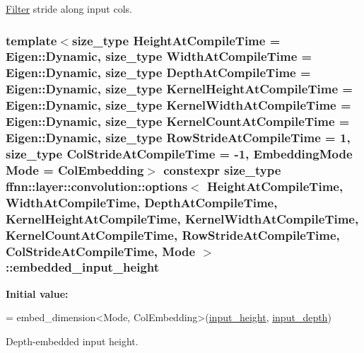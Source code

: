 \hyperlink{classffnn_1_1layer_1_1convolution_1_1_filter}{Filter} stride along input cols. 

\hypertarget{structffnn_1_1layer_1_1convolution_1_1options_a82e23d83d4ff1217b6aec5e49c94785e}{
\subsubsection[{embedded\-\_\-input\-\_\-height}]{\setlength{\rightskip}{0pt plus 5cm}template$<$size\-\_\-type Height\-At\-Compile\-Time = Eigen\-::\-Dynamic, size\-\_\-type Width\-At\-Compile\-Time = Eigen\-::\-Dynamic, size\-\_\-type Depth\-At\-Compile\-Time = Eigen\-::\-Dynamic, size\-\_\-type Kernel\-Height\-At\-Compile\-Time = Eigen\-::\-Dynamic, size\-\_\-type Kernel\-Width\-At\-Compile\-Time = Eigen\-::\-Dynamic, size\-\_\-type Kernel\-Count\-At\-Compile\-Time = Eigen\-::\-Dynamic, size\-\_\-type Row\-Stride\-At\-Compile\-Time = 1, size\-\_\-type Col\-Stride\-At\-Compile\-Time = -\/1, Embedding\-Mode Mode = Col\-Embedding$>$ constexpr {\bf size\-\_\-type} {\bf ffnn\-::layer\-::convolution\-::options}$<$ Height\-At\-Compile\-Time, Width\-At\-Compile\-Time, Depth\-At\-Compile\-Time, Kernel\-Height\-At\-Compile\-Time, Kernel\-Width\-At\-Compile\-Time, Kernel\-Count\-At\-Compile\-Time, Row\-Stride\-At\-Compile\-Time, Col\-Stride\-At\-Compile\-Time, Mode $>$\-::embedded\-\_\-input\-\_\-height\hspace{0.3cm}{\ttfamily [static]}}}\label{structffnn_1_1layer_1_1convolution_1_1options_a82e23d83d4ff1217b6aec5e49c94785e}
{\bfseries Initial value\-:}
\begin{DoxyCode}
=
    embed\_dimension<Mode, ColEmbedding>(\hyperlink{structffnn_1_1layer_1_1convolution_1_1options_aabb3c99df1150983902ebf9741a22a1a}{input\_height}, \hyperlink{structffnn_1_1layer_1_1convolution_1_1options_a5c928d8733be98927ccd22d009739deb}{input\_depth})
\end{DoxyCode}


Depth-\/embedded input height. 

